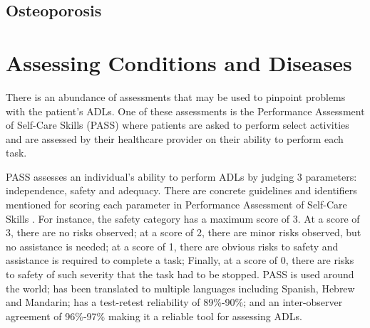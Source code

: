 \subsection{Osteoporosis}




\section{Assessing Conditions and Diseases}

There is an abundance of assessments that may be used to pinpoint problems with the patient’s ADLs. One of these assessments is the Performance Assessment of Self-Care Skills (PASS) where patients are asked to perform select activities and are assessed by their healthcare provider on their ability to perform each task. 


PASS assesses an individual’s ability to perform ADLs by judging 3 parameters: independence, safety and adequacy. There are concrete guidelines and identifiers mentioned for scoring each parameter in Performance Assessment of Self-Care Skills \cite{rogers_performance_2014}. For instance, the safety category has a maximum score of 3. At a score of 3, there are no risks observed; at a score of 2, there are minor risks observed, but no assistance is needed; at a score of 1, there are obvious risks to safety and assistance is required to complete a task; Finally, at a score of 0, there are risks to safety of such severity that the task had to be stopped. PASS is used around the world; has been translated to multiple languages including Spanish, Hebrew and Mandarin; has a test-retest reliability of 89\%-90\%; and an inter-observer agreement of 96\%-97\% \cite{chisholm_evaluating_2014} making it a reliable tool for assessing ADLs. 


